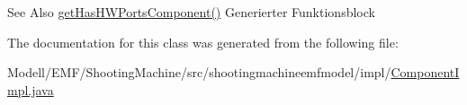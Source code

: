 \begin{DoxySeeAlso}{See Also}
\hyperlink{classshootingmachineemfmodel_1_1impl_1_1_component_impl_a278ec36c9c5c095e447ab6623e7c5900}{get\-Has\-H\-W\-Ports\-Component()} Generierter Funktionsblock  
\end{DoxySeeAlso}


The documentation for this class was generated from the following file\-:\begin{DoxyCompactItemize}
\item 
Modell/\-E\-M\-F/\-Shooting\-Machine/src/shootingmachineemfmodel/impl/\hyperlink{_component_impl_8java}{Component\-Impl.\-java}\end{DoxyCompactItemize}
